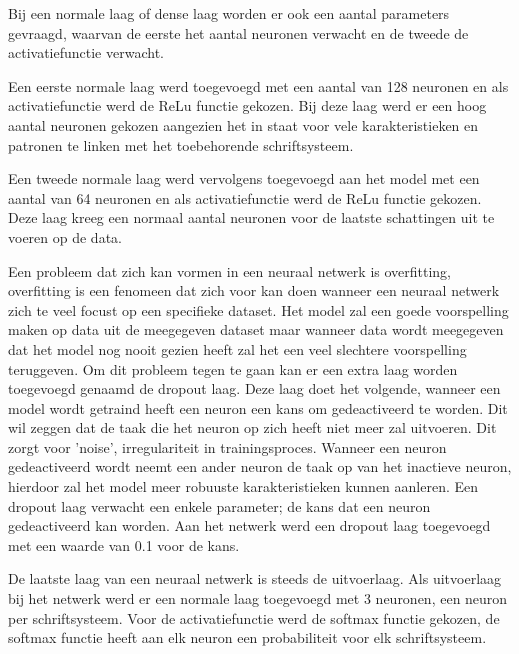 Bij een normale laag of dense laag worden er ook een aantal parameters gevraagd, waarvan de eerste het aantal neuronen verwacht en de tweede de activatiefunctie verwacht.

Een eerste normale laag werd toegevoegd met een aantal van 128 neuronen en als activatiefunctie werd de ReLu functie gekozen.
Bij deze laag werd er een hoog aantal neuronen gekozen aangezien het in staat voor vele karakteristieken en patronen te linken met het toebehorende schriftsysteem.

Een tweede normale laag werd vervolgens toegevoegd aan het model met een aantal van 64 neuronen en als activatiefunctie werd de ReLu functie gekozen.
Deze laag kreeg een normaal aantal neuronen voor de laatste schattingen uit te voeren op de data.

Een probleem dat zich kan vormen in een neuraal netwerk is overfitting,
overfitting is een fenomeen dat zich voor kan doen wanneer een neuraal netwerk zich te veel focust op een specifieke dataset.
Het model zal een goede voorspelling maken op data uit de meegegeven dataset maar wanneer data wordt meegegeven dat het model nog nooit gezien heeft zal het een veel slechtere voorspelling teruggeven.
Om dit probleem tegen te gaan kan er een extra laag worden toegevoegd genaamd de dropout laag.
Deze laag doet het volgende, wanneer een model wordt getraind heeft een neuron een kans om gedeactiveerd te worden.
Dit wil zeggen dat de taak die het neuron op zich heeft niet meer zal uitvoeren.
Dit zorgt voor 'noise', irregulariteit in trainingsproces.
Wanneer een neuron gedeactiveerd wordt neemt een ander neuron de taak op van het inactieve neuron, hierdoor zal het model meer robuuste karakteristieken kunnen aanleren.
Een dropout laag verwacht een enkele parameter; de kans dat een neuron gedeactiveerd kan worden.
Aan het netwerk werd een dropout laag toegevoegd met een waarde van 0.1 voor de kans.

De laatste laag van een neuraal netwerk is steeds de uitvoerlaag.
Als uitvoerlaag bij het netwerk werd er een normale laag toegevoegd met 3 neuronen, een neuron per schriftsysteem.
Voor de activatiefunctie werd de softmax functie gekozen, de softmax functie heeft aan elk neuron een probabiliteit voor elk schriftsysteem.

